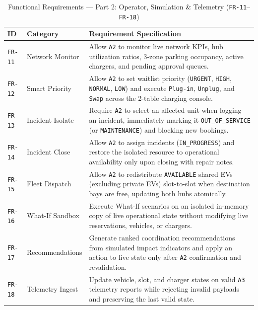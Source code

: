 \begin{table}[H]
  \centering
  \singlespacing\footnotesize
  \caption{Functional Requirements --- Part 2: Operator, Simulation \& Telemetry (\texttt{FR-11}--\texttt{FR-18})}
  \label{tab:fr-operator}
  \renewcommand{\arraystretch}{1.22}
  \begin{tabularx}{\textwidth}{|C{1.4cm}|L{2.7cm}|Y|}
    \hline
    \textbf{ID} & \textbf{Category} & \textbf{Requirement Specification} \\
    \hline
    \texttt{FR-11} & Network Monitor & Allow \texttt{A2} to monitor live network KPIs, hub utilization ratios, 3-zone parking occupancy, active chargers, and pending approval queues. \\
    \hline
    \texttt{FR-12} & Smart Priority & Allow \texttt{A2} to set waitlist priority (\texttt{URGENT}, \texttt{HIGH}, \texttt{NORMAL}, \texttt{LOW}) and execute \texttt{Plug-in}, \texttt{Unplug}, and \texttt{Swap} across the 2-table charging console. \\
    \hline
    \texttt{FR-13} & Incident Isolate & Require \texttt{A2} to select an affected unit when logging an incident, immediately marking it \texttt{OUT\_\allowbreak OF\_\allowbreak SERVICE} (or \texttt{MAINTENANCE}) and blocking new bookings. \\
    \hline
    \texttt{FR-14} & Incident Close & Allow \texttt{A2} to assign incidents (\texttt{IN\_\allowbreak PROGRESS}) and restore the isolated resource to operational availability only upon closing with repair notes. \\
    \hline
    \texttt{FR-15} & Fleet Dispatch & Allow \texttt{A2} to redistribute \texttt{AVAILABLE} shared EVs (excluding private EVs) slot-to-slot when destination bays are free, updating both hubs atomically. \\
    \hline
    \texttt{FR-16} & What-If Sandbox & Execute What-If scenarios on an isolated in-memory copy of live operational state without modifying live reservations, vehicles, or chargers. \\
    \hline
    \texttt{FR-17} & Recommendations & Generate ranked coordination recommendations from simulated impact indicators and apply an action to live state only after \texttt{A2} confirmation and revalidation. \\
    \hline
    \texttt{FR-18} & Telemetry Ingest & Update vehicle, slot, and charger states on valid \texttt{A3} telemetry reports while rejecting invalid payloads and preserving the last valid state. \\
    \hline
  \end{tabularx}
\end{table}

